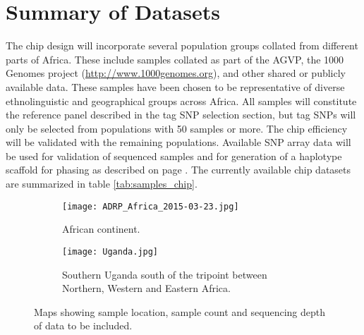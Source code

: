 \section{Summary of Datasets}
The chip design will incorporate several population groups collated from different parts of Africa. These include samples collated as part of the AGVP\cite{Gurdasani2015}, the 1000 Genomes project (\href{http://www.1000genomes.org}{http://www.1000genomes.org}),
 and other shared or publicly available data. These samples have been chosen to be representative of diverse ethnolinguistic and geographical groups across Africa. All samples will constitute the reference panel described in the tag SNP selection section, but tag SNPs will only be selected from populations with 50 samples or more. The chip efficiency will be validated with the remaining populations. Available SNP array data will be used for validation of sequenced samples and for generation of a haplotype scaffold for phasing as described on page \pageref{sec:refine_and_phase}. The currently available chip datasets are summarized in table \ref{tab:samples_chip}.
 
\begin{figure}[h]
\begin{subfigure}{.5\textwidth}
  \centering
  \texttt{[image: ADRP\_Africa\_2015-03-23.jpg]}
  \caption{African continent.}
\end{subfigure}%
\begin{subfigure}{.5\textwidth}
  \centering
  \texttt{[image: Uganda.jpg]}
  \caption{Southern Uganda south of the tripoint between Northern, Western and Eastern Africa.}
\end{subfigure}%
\caption{Maps showing sample location, sample count and sequencing depth of data to be included.}
\end{figure}



